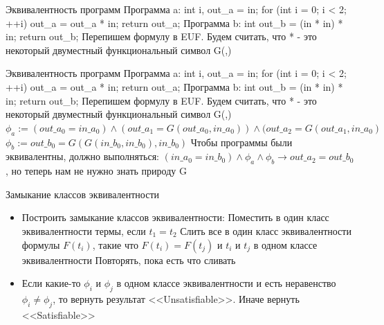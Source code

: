 \documentclass{beamer}
\begin{document}
\begin{frame}{Эквивалентность программ}
Программа a:\newline
int i, out\_a = in;\newline
for (int i = 0; i < 2; ++i) out\_a = out\_a * in;\newline
return out\_a;\newline
Программа b:\newline
int out\_b = (in * in) * in;\newline
return out\_b;\newline
Перепишем формулу в EUF. Будем считать, что * - это некоторый двуместный функциональный символ G(,)
\end{frame}

\begin{frame}{Эквивалентность программ}
Программа a:\newline
int i, out\_a = in;\newline
for (int i = 0; i < 2; ++i) out\_a = out\_a * in;\newline
return out\_a;\newline
Программа b:\newline
int out\_b = (in * in) * in;\newline
return out\_b;\newline
Перепишем формулу в EUF. Будем считать, что * - это некоторый двуместный функциональный символ G(,)
$\phi_a := (out\_a_0 = in\_a_0) \wedge (out\_a_1 = G(out\_a_0, in\_a_0)) \wedge (out\_a_2 = G(out\_a_1, in\_a_0)$\newline
$\phi_b := out\_b_0 = G(G(in\_b_0, in\_b_0), in\_b_0)$\newline
Чтобы программы были эквивалентны, должно выполняться:\newline
$(in\_a_0 = in\_b_0) \wedge \phi_a \wedge \phi_b \rightarrow out\_a_2 = out\_b_0$, но теперь нам не нужно знать природу G
\end{frame}

\begin{frame}{Замыкание классов эквивалентности}
\begin{itemize}
\item Построить замыкание классов эквивалентности:\newline
Поместить в один класс эквивалентности термы, если $t_1 = t_2$\newline
Слить все в один класс эквивалентности формулы $F(t_i)$, такие что $F(t_i) = F(t_j)$ и $t_i$ и $t_j$ в одном классе
эквивалентности\newline
Повторять, пока есть что сливать
\item Если какие-то $\phi_i$ и $\phi_j$ в одном классе эквивалентности и есть неравенство $\phi_i \neq \phi_j$, то вернуть результат
<<Unsatisfiable>>. Иначе вернуть <<Satisfiable>>
\end{itemize}
\end{frame}
\end{document}
